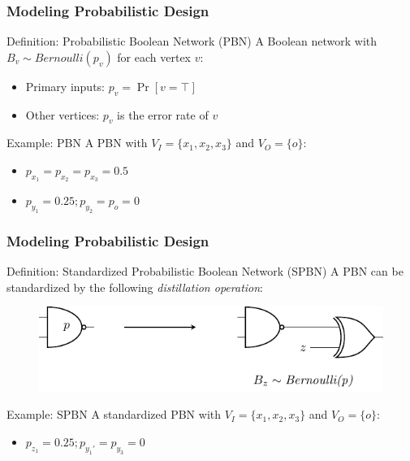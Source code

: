 \begin{frame}
  \frametitle{Modeling Probabilistic Design}
  \begin{block}{Definition: Probabilistic Boolean Network (PBN)}
    A Boolean network with $B_v\sim\textit{Bernoulli}(p_v)$ for each vertex $v$:
    \pause
    \begin{itemize}
      \item Primary inputs: $p_v=\Pr[v=\top]$
            \pause
      \item Other vertices: $p_v$ is the error rate of $v$
    \end{itemize}
  \end{block}
  \pause
  \begin{block}{Example: PBN}
    A PBN with $V_I=\{x_1,x_2,x_3\}$ and $V_O=\{o\}$:
    \begin{figure}
      \centering
      
    \end{figure}
    \pause
    \begin{itemize}
      \item $p_{x_1}=p_{x_2}=p_{x_3}=0.5$
            \pause
      \item $p_{y_1}=0.25;p_{y_2}=p_{o}=0$
    \end{itemize}
  \end{block}
\end{frame}

\begin{frame}
  \frametitle{Modeling Probabilistic Design}
  \begin{block}{Definition: Standardized Probabilistic Boolean Network (SPBN)}
    A PBN can be standardized by the following \textit{distillation operation}:
    \pause
    \begin{figure}
      \centering
      \includegraphics[scale=0.8]{fig/prob-design-eval/prob-distillation.pdf}
    \end{figure}
  \end{block}
  \pause
  \begin{block}{Example: SPBN}
    A standardized PBN with $V_I=\{x_1,x_2,x_3\}$ and $V_O=\{o\}$:
    \begin{figure}
      \centering
      
    \end{figure}
    \pause
    \begin{itemize}
      \item $p_{z_1}=0.25;p_{y_1'}=p_{y_3}=0$
    \end{itemize}
  \end{block}
\end{frame}
